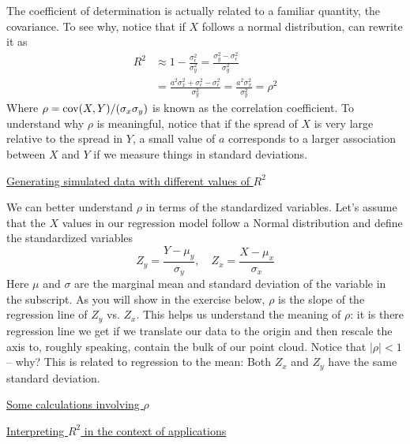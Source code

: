 The coefficient of determination is actually related to a familiar quantity, the covariance. To see why, notice that if $X$ follows a normal distribution, can rewrite it as
\begin{align}
R^2 &\approx 1 - \frac{\sigma_{\epsilon}^2}{\sigma_y^2}  = \frac{\sigma_y^2 - \sigma_{\epsilon}^2}{\sigma_y^2}\\
&=  \frac{a^2\sigma_{x}^2 + \sigma_{\epsilon}^2 - \sigma_{\epsilon}^2}{\sigma_y^2}
=  \frac{a^2\sigma_{x}^2}{\sigma_y^2} =\rho^2
\end{align}
Where $\rho   ={\rm cov}(X,Y)/(\sigma_x\sigma_y)$ is known as the {\dfn correlation coefficient}. 
To understand why $\rho$ is meaningful, notice that if the spread of $X$ is very large relative to the spread in $Y$, a small value of $a$ corresponds to a larger association between $X$ and $Y$ if we measure things in standard deviations.



\begin{example}
\href{https://colab.research.google.com/drive/143hintE_kXYGkEIphvkUz5ngCdNu22F0#scrollTo=XIUxH9Pyav2F&line=1&uniqifier=1}{Generating simulated data with different values of $R^2$}
\end{example}

We can better understand $\rho$ in terms of the standardized variables. Let's assume that the $X$ values in our regression model follow a Normal distribution and define the standardized variables 
\begin{equation}
Z_y = \frac{Y - \mu_y}{\sigma_y},\quad Z_x = \frac{X - \mu_x}{\sigma_x}
\end{equation}
Here $\mu$ and $\sigma$ are the marginal mean and standard deviation of the variable in the subscript. 
As you will show in the exercise below, $\rho$ is the slope of the regression line of $Z_y$ vs. $Z_x$. This helps us understand the meaning of $\rho$: it is there regression line we get if we translate our data to the origin and then rescale the axis to, roughly speaking, contain the bulk of our point cloud. Notice that $|\rho|<1$ -- why? This is related to regression to the mean: Both $Z_x$ and $Z_y$ have the same standard deviation. 

\begin{exercise}
\href{https://colab.research.google.com/drive/143hintE_kXYGkEIphvkUz5ngCdNu22F0#scrollTo=EuQ-M6mawB2X&line=3&uniqifier=1}{Some calculations involving $\rho$}
\end{exercise}


\begin{exercise}
\href{https://colab.research.google.com/drive/143hintE_kXYGkEIphvkUz5ngCdNu22F0#scrollTo=4MTDvF3Rs1oo&line=1&uniqifier=1}{Interpreting $R^2$ in the context of applications}
\end{exercise}


